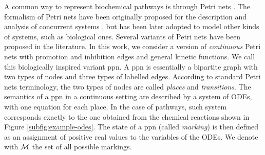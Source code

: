 

A common way to represent biochemical pathways is through Petri nets \cite{?}. The formalism of Petri nets have been originally proposed for the description and analysis of concurrent systems \cite{?}, but has been later adopted to model other kinds of systems, such as biological ones. Several variants of Petri nets have been proposed in the literature. In this work, we consider a version of \emph{continuous} Petri nets \cite{?} with promotion and inhibition edges and general kinetic functions. We call this biologically inspired variant \gls{ppn}. A \gls{ppn} is essentially a bipartite graph with two types of nodes and three types of labelled edges. According to standard Petri nets terminology, the two types of nodes are called \emph{places} and \emph{transitions}. The semantics of a \gls{ppn} in a continuous setting are described by a system of ODEs, with one equation for each place. In the case of pathways, such system corresponds exactly to the one obtained from the chemical reactions shown in Figure \ref{subfig:example-odes}. The state of a \gls{ppn} (called \emph{marking}) is then defined as an assignment of positive real values to the variables of the ODEs. We denote with $\Cal{M}$ the set of all possible markings.

